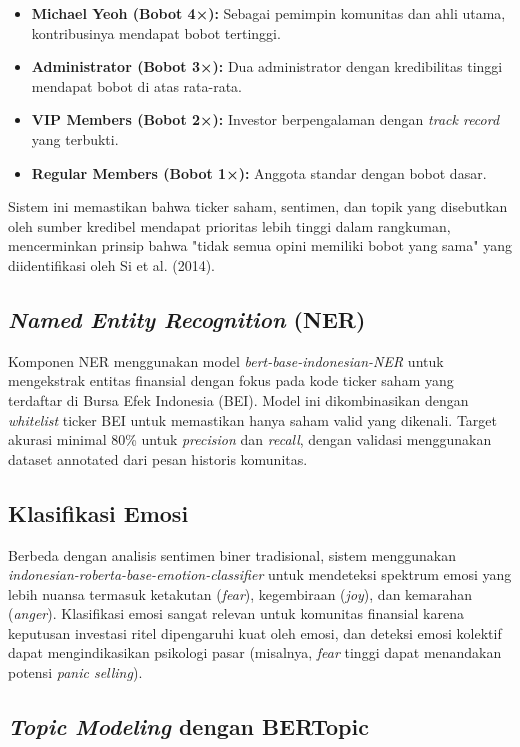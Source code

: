 \begin{itemize}
\item \textbf{Michael Yeoh (Bobot 4×):} Sebagai pemimpin komunitas dan ahli utama, kontribusinya mendapat bobot tertinggi.
\item \textbf{Administrator (Bobot 3×):} Dua administrator dengan kredibilitas tinggi mendapat bobot di atas rata-rata.
\item \textbf{VIP Members (Bobot 2×):} Investor berpengalaman dengan \textit{track record} yang terbukti.
\item \textbf{Regular Members (Bobot 1×):} Anggota standar dengan bobot dasar.
\end{itemize}

Sistem ini memastikan bahwa ticker saham, sentimen, dan topik yang disebutkan oleh sumber kredibel mendapat prioritas lebih tinggi dalam rangkuman, mencerminkan prinsip bahwa "tidak semua opini memiliki bobot yang sama" yang diidentifikasi oleh Si et al. (2014).

\subsection{\textit{Named Entity Recognition} (NER)}

Komponen NER menggunakan model \textit{bert-base-indonesian-NER} untuk mengekstrak entitas finansial dengan fokus pada kode ticker saham yang terdaftar di Bursa Efek Indonesia (BEI). Model ini dikombinasikan dengan \textit{whitelist} ticker BEI untuk memastikan hanya saham valid yang dikenali. Target akurasi minimal 80\% untuk \textit{precision} dan \textit{recall}, dengan validasi menggunakan dataset annotated dari pesan historis komunitas.

\subsection{Klasifikasi Emosi}

Berbeda dengan analisis sentimen biner tradisional, sistem menggunakan \textit{indonesian-roberta-base-emotion-classifier} untuk mendeteksi spektrum emosi yang lebih nuansa termasuk ketakutan (\textit{fear}), kegembiraan (\textit{joy}), dan kemarahan (\textit{anger}). Klasifikasi emosi sangat relevan untuk komunitas finansial karena keputusan investasi ritel dipengaruhi kuat oleh emosi, dan deteksi emosi kolektif dapat mengindikasikan psikologi pasar (misalnya, \textit{fear} tinggi dapat menandakan potensi \textit{panic selling}).

\subsection{\textit{Topic Modeling} dengan BERTopic}

